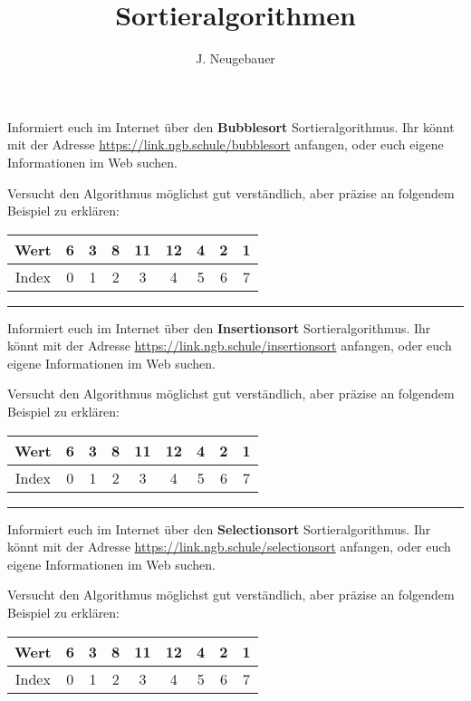 \documentclass[10pt, a4paper]{scrartcl}
\author{J. Neugebauer}
\title{Sortieralgorithmen}
\date{\Heute}
\begin{document}
\ReiheTitel[Bubblesort]

Informiert euch im Internet über den \textbf{Bubblesort} Sortieralgorithmus. Ihr könnt mit der Adresse \url{https://link.ngb.schule/bubblesort} anfangen, oder euch eigene Informationen im Web suchen.

Versucht den Algorithmus möglichst gut verständlich, aber präzise an folgendem Beispiel zu erklären:

\begin{center}
\begin{tabular}{|*{9}{c|}}\hline
Wert & 6 & 3 & 8 & 11 & 12 & 4 & 2 & 1 \\ \hline
\rowcolor{black!20}
Index & 0 & 1 & 2 & 3 & 4 & 5 & 6 & 7 \\ \hline
\end{tabular}
\end{center}


\rule{\textwidth}{.2pt}

\ReiheTitel[Insertionsort]

Informiert euch im Internet über den \textbf{Insertionsort} Sortieralgorithmus. Ihr könnt mit der Adresse \url{https://link.ngb.schule/insertionsort} anfangen, oder euch eigene Informationen im Web suchen.

Versucht den Algorithmus möglichst gut verständlich, aber präzise an folgendem Beispiel zu erklären:

\begin{center}
\begin{tabular}{|*{9}{c|}}\hline
Wert & 6 & 3 & 8 & 11 & 12 & 4 & 2 & 1 \\ \hline
\rowcolor{black!20}
Index & 0 & 1 & 2 & 3 & 4 & 5 & 6 & 7 \\ \hline
\end{tabular}
\end{center}


\rule{\textwidth}{.2pt}

\ReiheTitel[Selectionsort]

Informiert euch im Internet über den \textbf{Selectionsort} Sortieralgorithmus. Ihr könnt mit der Adresse \url{https://link.ngb.schule/selectionsort} anfangen, oder euch eigene Informationen im Web suchen.

Versucht den Algorithmus möglichst gut verständlich, aber präzise an folgendem Beispiel zu erklären:

\begin{center}
\begin{tabular}{|*{9}{c|}}\hline
Wert & 6 & 3 & 8 & 11 & 12 & 4 & 2 & 1 \\ \hline
\rowcolor{black!20}
Index & 0 & 1 & 2 & 3 & 4 & 5 & 6 & 7 \\ \hline
\end{tabular}
\end{center}

\end{document}
